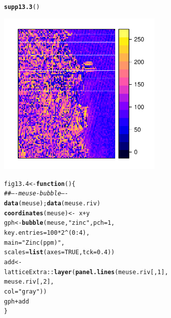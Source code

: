 \documentclass[12pt, a4paper,  BCOR=8.25mm, DIV=15]{scrartcl}\usepackage[]{graphicx}\usepackage[]{color}
\makeatletter
\newcommand{\hlnum}[1]{\textcolor[rgb]{0.686,0.059,0.569}{#1}}%
\newcommand{\hlstr}[1]{\textcolor[rgb]{0.192,0.494,0.8}{#1}}%
\newcommand{\hlcom}[1]{\textcolor[rgb]{0.678,0.584,0.686}{\textit{#1}}}%
\newcommand{\hlopt}[1]{\textcolor[rgb]{0,0,0}{#1}}%
\newcommand{\hlstd}[1]{\textcolor[rgb]{0.345,0.345,0.345}{#1}}%
\newcommand{\hlkwa}[1]{\textcolor[rgb]{0.161,0.373,0.58}{\textbf{#1}}}%
\newcommand{\hlkwb}[1]{\textcolor[rgb]{0.69,0.353,0.396}{#1}}%
\newcommand{\hlkwc}[1]{\textcolor[rgb]{0.333,0.667,0.333}{#1}}%
\newcommand{\hlkwd}[1]{\textcolor[rgb]{0.737,0.353,0.396}{\textbf{#1}}}%
\newenvironment{kframe}{%
 \def\at@end@of@kframe{}%
 \ifinner\ifhmode%
  \def\at@end@of@kframe{\end{minipage}}%
  \begin{minipage}{\columnwidth}%
 \fi\fi%
 \def\FrameCommand##1{\hskip\@totalleftmargin \hskip-\fboxsep
 \colorbox{shadecolor}{##1}\hskip-\fboxsep
     \hskip-\linewidth \hskip-\@totalleftmargin \hskip\columnwidth}%
 \MakeFramed {\advance\hsize-\width
   \@totalleftmargin\z@ \linewidth\hsize
   \@setminipage}}%
 {\par\unskip\endMakeFramed%
 \at@end@of@kframe}
\newenvironment{knitrout}{}{} %
\makeatother
\begin{document}
\begin{suppfigure}
\begin{knitrout}
\color{fgcolor}\begin{kframe}
\begin{alltt}
\hlkwd{supp13.3}\hlstd{()}
\end{alltt}
\end{kframe}

{\centering \includegraphics[width=0.6\textwidth]{figs/map-sp27-13_3-1} 

}



\end{knitrout}
\end{suppfigure}



\begin{knitrout}
\color{fgcolor}\begin{kframe}
\begin{alltt}
\hlstd{fig13.4} \hlkwb{<-} \hlkwa{function}\hlstd{()\{}
\hlcom{## ---- meuse-bubble ----}
\hlkwd{data}\hlstd{(meuse);} \hlkwd{data}\hlstd{(meuse.riv)}
\hlkwd{coordinates}\hlstd{(meuse)} \hlkwb{<-} \hlopt{~} \hlstd{x} \hlopt{+} \hlstd{y}
\hlstd{gph} \hlkwb{<-} \hlkwd{bubble}\hlstd{(meuse,} \hlstr{"zinc"}\hlstd{,} \hlkwc{pch}\hlstd{=}\hlnum{1}\hlstd{,}
              \hlkwc{key.entries} \hlstd{=}  \hlnum{100} \hlopt{*} \hlnum{2}\hlopt{^}\hlstd{(}\hlnum{0}\hlopt{:}\hlnum{4}\hlstd{),}
              \hlkwc{main} \hlstd{=} \hlstr{"Zinc(ppm)"}\hlstd{,}
              \hlkwc{scales}\hlstd{=}\hlkwd{list}\hlstd{(}\hlkwc{axes}\hlstd{=}\hlnum{TRUE}\hlstd{,} \hlkwc{tck}\hlstd{=}\hlnum{0.4}\hlstd{))}
\hlstd{add} \hlkwb{<-}
  \hlstd{latticeExtra}\hlopt{::}\hlkwd{layer}\hlstd{(}\hlkwd{panel.lines}\hlstd{(meuse.riv[,}\hlnum{1}\hlstd{],}
                                  \hlstd{meuse.riv[,}\hlnum{2}\hlstd{],}
                      \hlkwc{col}\hlstd{=}\hlstr{"gray"}\hlstd{))}
\hlstd{gph}\hlopt{+}\hlstd{add}
\hlstd{\}}
\end{alltt}
\end{kframe}
\end{knitrout}
\end{document}
